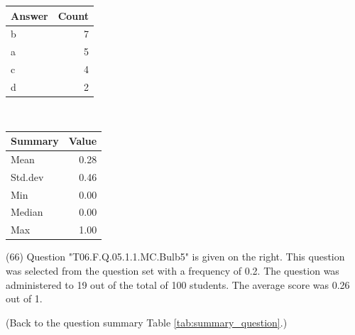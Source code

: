 \documentclass[12pt,nohyper]{tufte-handout}\usepackage[]{graphicx}\usepackage[]{color}
\begin{document}
\begin{center}%
\begin{tabular}{lr}
  \hline
Answer & Count \\ 
  \hline
b &   7 \\ 
  a &   5 \\ 
  c &   4 \\ 
  d &   2 \\ 
   \hline
\end{tabular}
~~~~~~~~%
\begin{tabular}{lr}
  \hline
Summary & Value \\ 
  \hline
Mean & 0.28 \\ 
  Std.dev & 0.46 \\ 
  Min & 0.00 \\ 
  Median & 0.00 \\ 
  Max & 1.00 \\ 
   \hline
\end{tabular}
\end{center}\newpage{} (66) Question "T06.F.Q.05.1.1.MC.Bulb5" is given on the right. This question was selected from the question set with a frequency of 0.2. The question was administered to 19 out of the total of 100 students. The average score was 0.26 out of 1.

 (Back to the question summary Table \ref{tab:summary_question}.)
\end{document}
